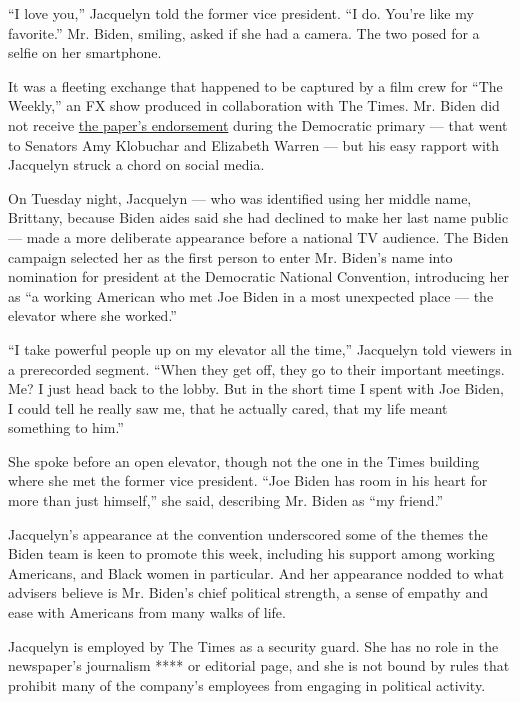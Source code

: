 ``I love you,'' Jacquelyn told the former vice president. ``I do. You're
like my favorite.'' Mr. Biden, smiling, asked if she had a camera. The
two posed for a selfie on her smartphone.

It was a fleeting exchange that happened to be captured by a film crew
for ``The Weekly,'' an FX show produced in collaboration with The Times.
Mr. Biden did not receive
\href{https://www.nytimes3xbfgragh.onion/2020/01/19/us/politics/amy-klobuchar-elizabeth-warren-new-york-times-endorsement.html}{the
paper's endorsement} during the Democratic primary --- that went to
Senators Amy Klobuchar and Elizabeth Warren --- but his easy rapport
with Jacquelyn struck a chord on social media.

On Tuesday night, Jacquelyn --- who was identified using her middle
name, Brittany, because Biden aides said she had declined to make her
last name public --- made a more deliberate appearance before a national
TV audience. The Biden campaign selected her as the first person to
enter Mr. Biden's name into nomination for president at the Democratic
National Convention, introducing her as ``a working American who met Joe
Biden in a most unexpected place --- the elevator where she worked.''

``I take powerful people up on my elevator all the time,'' Jacquelyn
told viewers in a prerecorded segment. ``When they get off, they go to
their important meetings. Me? I just head back to the lobby. But in the
short time I spent with Joe Biden, I could tell he really saw me, that
he actually cared, that my life meant something to him.''

She spoke before an open elevator, though not the one in the Times
building where she met the former vice president. ``Joe Biden has room
in his heart for more than just himself,'' she said, describing Mr.
Biden as ``my friend.''

Jacquelyn's appearance at the convention underscored some of the themes
the Biden team is keen to promote this week, including his support among
working Americans, and Black women in particular. And her appearance
nodded to what advisers believe is Mr. Biden's chief political strength,
a sense of empathy and ease with Americans from many walks of life.

Jacquelyn is employed by The Times as a security guard. She has no role
in the newspaper's journalism **** or editorial page, and she is not
bound by rules that prohibit many of the company's employees from
engaging in political activity.

